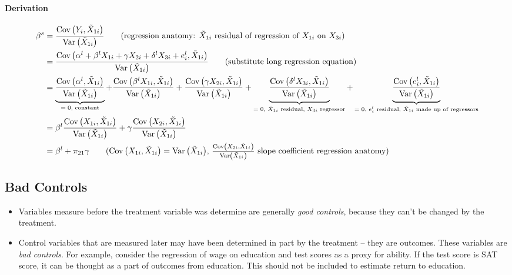 \documentclass[11pt]{article}
\begin{document}
\paragraph*{Derivation}

\small
\begin{align*}
	\beta^{s} &= \frac{\cov{Y_i,\tilde{X}_{1i}}}{\var{\tilde{X}_{1i}}} \tag{regression anatomy: $\tilde{X}_{1i}$ residual of regression of $X_{1i}$ on $X_{3i}$} \\
	&= \frac{\cov{\alpha^{l}+\beta^{l} X_{1 i}+\gamma X_{2 i} + \delta^{l} X_{3 i} +e_{i}^{l},\tilde{X}_{1i}}}{\var{\tilde{X}_{1i}}} \tag{substitute long regression equation} \\
	&= \ubt{\frac{\cov{\alpha^{l},\tilde{X}_{1i}}}{\var{\tilde{X}_{1i}}}}{$=0$, constant} + 
	\frac{\cov{\beta^{l} X_{1 i},\tilde{X}_{1i}}}{\var{\tilde{X}_{1i}}} + 
	\frac{\cov{\gamma X_{2 i},\tilde{X}_{1i}}}{\var{\tilde{X}_{1i}}} + 
	\ubt{\frac{\cov{\delta^{l} X_{3 i},\tilde{X}_{1i}}}{\var{\tilde{X}_{1i}}}}{$=0$, $\tilde{X}_{1i}$ residual, $X_{3i}$ regressor} + 
	\ubt{\frac{\cov{e_{i}^{l},\tilde{X}_{1i}}}{\var{\tilde{X}_{1i}}}}{$=0$, $e^l_i$ residual, $\tilde{X}_{1i}$ made up of regressors} \\
	&= \beta^l \frac{\cov{X_{1 i},\tilde{X}_{1i}}}{\var{\tilde{X}_{1i}}} + \gamma \frac{\cov{X_{2 i},\tilde{X}_{1i}}}{\var{\tilde{X}_{1i}}} \\
	&= \beta^l + \pi_{21} \gamma \tag{$\cov{X_{1i},\tilde{X}_{1i}} = \var{\tilde{X}_{1i}}$, $\frac{\cov{X_{2 i},\tilde{X}_{1i}}}{\var{\tilde{X}_{1i}}}$ slope coefficient regression anatomy}
\end{align*}


\subsection{Bad Controls}

\begin{itemize}
	\item Variables measure before the treatment variable was determine are generally \emph{good controls}, because they can't be changed by the treatment. 
	\item Control variables that are measured later may have been determined in part by the treatment -- they are outcomes. These variables are \emph{bad controls}. For example, consider the regression of wage on education and test scores as a proxy for ability. If the test score is SAT score, it can be thought as a part of outcomes from education. This should not be included to estimate return to education.
\end{itemize}
\end{document}
